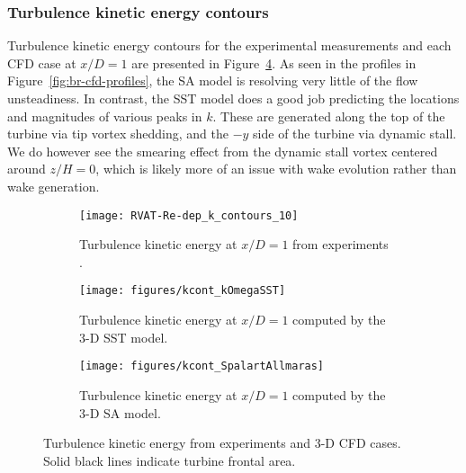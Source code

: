 \subsubsection{Turbulence kinetic energy contours}

Turbulence kinetic energy contours for the experimental measurements and each
CFD case at $x/D=1$ are presented in Figure~\ref{fig:br-cfd-kcont}. As seen in
the profiles in Figure~\ref{fig:br-cfd-profiles}, the SA model is resolving very
little of the flow unsteadiness. In contrast, the SST model does a good job
predicting the locations and magnitudes of various peaks in $k$. These are
generated along the top of the turbine via tip vortex shedding, and the $-y$
side of the turbine via dynamic stall. We do however see the smearing effect
from the dynamic stall vortex centered around $z/H=0$, which is likely more of
an issue with wake evolution rather than wake generation.

\begin{figure}
    \centering
    \begin{subfigure}[b]{\textwidth}
        \centering

        \texttt{[image: RVAT-Re-dep\_k\_contours\_10]}

        \caption{Turbulence kinetic energy at $x/D=1$ from experiments
            \cite{Bachant2016-RVAT-Re-dep}.}

        \label{fig:kcont-exp}
    \end{subfigure}

    \begin{subfigure}[b]{\textwidth}
        \centering

        \texttt{[image: figures/kcont\_kOmegaSST]}

        \caption{Turbulence kinetic energy at $x/D=1$ computed by the 3-D SST
            model.}

        \label{fig:kcont-SST}
    \end{subfigure}

    \begin{subfigure}[b]{\textwidth}
        \centering

        \texttt{[image: figures/kcont\_SpalartAllmaras]}

        \caption{Turbulence kinetic energy at $x/D=1$ computed by the 3-D SA
            model.}

        \label{fig:kcont-SA}
    \end{subfigure}

    \caption{Turbulence kinetic energy from experiments and 3-D CFD cases. Solid
        black lines indicate turbine frontal area.}

    \label{fig:br-cfd-kcont}
\end{figure}


